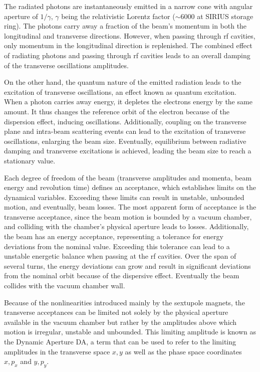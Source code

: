 The radiated photons are instantaneously emitted in a narrow cone with angular aperture of $1/\gamma$, $\gamma$ being the relativistic Lorentz factor ($\sim 6000$ at SIRIUS storage ring). The photons carry away a fraction of the beam's momentum in both the longitudinal and transverse directions. However, when passing through \gls*{rf} cavities, only momentum in the longitudinal direction is replenished. The combined effect of radiating photons and passing through \gls*{rf} cavities leads to an overall damping of the transverse oscillations amplitudes.

On the other hand, the quantum nature of the emitted radiation leads to the excitation of transverse oscillations, an effect known as quantum excitation. When a photon carries away energy, it depletes the electrons energy by the same amount. It thus changes the reference orbit of the electron because of the dispersion effect, inducing oscillations. Additionally, coupling on the transverse plane and intra-beam scattering events can lead to the excitation of transverse oscillations, enlarging the beam size.
Eventually, equilibrium between radiative damping and transverse excitations is achieved, leading the beam size to reach a stationary value.

Each degree of freedom of the beam (transverse amplitudes and momenta, beam energy and revolution time) defines an acceptance, which establishes limits on the dynamical variables. Exceeding these limits can result in unstable, unbounded motion, and eventually, beam losses. The most apparent form of acceptance is the transverse acceptance, since the beam motion is bounded by a vacuum chamber, and colliding with the chamber's physical aperture leads to losses. Additionally, the beam has an energy acceptance, representing a tolerance for energy deviations from the nominal value. Exceeding this tolerance can lead to a unstable energetic balance when passing at the \gls*{rf} cavities. Over the span of several turns, the energy deviations can grow and result in significant deviations from the nominal orbit because of the dispersive effect. Eventually the beam collides with the vacuum chamber wall.

Because of the nonlinearities introduced mainly by the sextupole magnets, the transverse acceptances can be limited not solely by the physical aperture available in the vacuum chamber but rather by the amplitudes above which motion is irregular, unstable and unbounded. This limiting amplitude is known as the Dynamic Aperture \gls*{DA}, a term that can be used to refer to the limiting amplitudes in the transverse space $x,y$ as well as the phase space coordinates $x, p_x$ and $y, p_y$.


